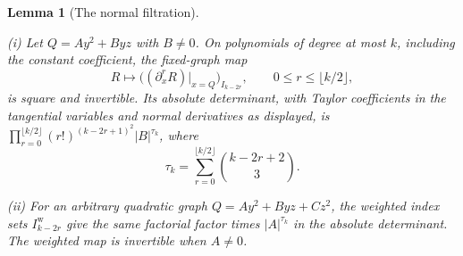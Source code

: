 \documentclass[11pt]{amsart}
\newtheorem{lemma}[theorem]{Lemma}
\theoremstyle{definition}
\theoremstyle{remark}
\numberwithin{equation}{section}
\begin{document}
\begin{lemma}[The normal filtration]\label{surf:normal-filtration}

\leavevmode\noindent\textup{(i)} Let $Q=Ay^2+Byz$ with $B\ne0$. On polynomials of degree at most $k$, including the constant coefficient, the fixed-graph map
\[
R\longmapsto\bigl((\partial_x^rR)|_{x=Q}\bigr)_{I_{k-2r}},\qquad 0\le r\le\lfloor k/2\rfloor,
\]
is square and invertible. Its absolute determinant, with Taylor coefficients in the tangential variables and normal derivatives as displayed, is $\prod_{r=0}^{\lfloor k/2\rfloor}(r!)^{(k-2r+1)^2}|B|^{\tau_k}$, where
\[
 \tau_k=\sum_{r=0}^{\lfloor k/2\rfloor}\binom{k-2r+2}{3}.
\]

\noindent\textup{(ii)} For an arbitrary quadratic graph $Q=Ay^2+Byz+Cz^2$, the weighted index sets $I_{k-2r}^{\mathrm w}$ give the same factorial factor times $|A|^{\tau_k}$ in the absolute determinant. The weighted map is invertible when $A\ne0$.

\end{lemma}
\end{document}
